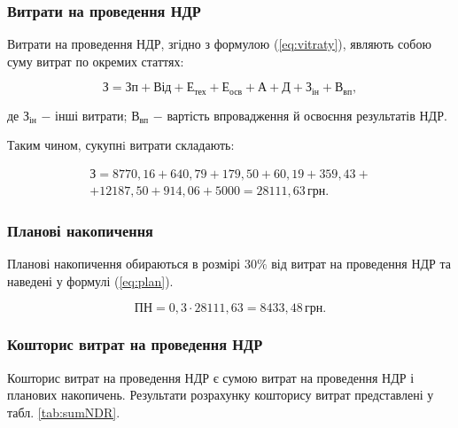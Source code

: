 \subsubsection{Витрати на проведення НДР}

Витрати на проведення НДР, згідно з формулою (\ref{eq:vitraty}), являють собою суму витрат по окремих статтях:

\begin{equation}\label{eq:vitraty}
\text{З} = \text{Зп} + \text{Від} + \text{Е}_{\text{тех}} + \text{Е}_{\text{осв}} + \text{А} + \text{Д} + \text{З}_{\text{ін}} + \text{В}_{\text{вп}},
\end{equation}

\noindent де $\text{З}_{\text{ін}}$ $-$ інші витрати; \newline
\hspace*{15pt} $ \text{В}_{\text{вп}}$ $-$ вартість впровадження й освоєння результатів НДР.

Таким чином, сукупнi витрати складають:

\begin{eqnarray*}
\text{З} = 8770,16 + 640,79 + 179,50 + 60,19 + 359,43 + \\ + 12187,50 + 914,06 + 5000  = 28111,63 \, \text{грн}.
\end{eqnarray*}

\vspace{1.5em}

\subsubsection{Планові накопичення}

Планові накопичення обираються в розмірі $30\%$ від витрат на проведення НДР та наведені у формулі (\ref{eq:plan}).

\begin{equation}\label{eq:plan}
\text{ПН} = 0,3 \cdot 28111,63 = 8433,48 \, \text{грн}.
\end{equation}

\vspace{1.5em}

\subsubsection{Кошторис витрат на проведення НДР}

Кошторис витрат на проведення НДР є сумою витрат на проведення НДР і планових накопичень. Результати розрахунку кошторису витрат представлені у табл. \ref{tab:sumNDR}.

